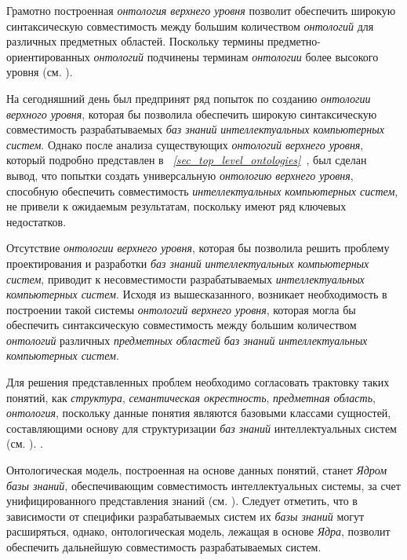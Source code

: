 Грамотно построенная \textit{онтология верхнего уровня} позволит обеспечить широкую синтаксическую совместимость между большим количеством \textit{онтологий} для различных предметных областей. Поскольку термины предметно-ориентированных \textit{онтологий} подчинены терминам \textit{онтологии} более высокого уровня (см. ). 

На сегодняшний день был предпринят ряд попыток по созданию \textit{онтологии верхного уровня}, которая бы позволила обеспечить широкую синтаксическую совместимость разрабатываемых \textit{баз знаний} \textit{интеллектуальных компьютерных систем}. Однако после анализа существующих \textit{онтологий верхнего уровня}, который подробно представлен в \textit{~\ref{sec_top_level_ontologies}~}, был сделан вывод, что попытки создать универсальную \textit{онтологию верхнего уровня}, способную обеспечить совместимость \textit{интеллектуальных компьютерных систем}, не привели к ожидаемым результатам, поскольку имеют ряд ключевых недостатков.

Отсутствие \textit{онтологии верхнего уровня}, которая бы позволила решить проблему проектирования и разработки \textit{баз знаний} \textit{интеллектуальных компьютерных систем}, приводит к несовместимости разрабатываемых \textit{интеллектуальных компьютерных систем}. Исходя из вышесказанного, возникает необходимость в построении такой системы \textit{онтологий верхнего уровня}, которая могла бы обеспечить синтаксическую совместимость между большим количеством \textit{онтологий} различных \textit{предметных областей} \textit{баз знаний} \textit{интеллектуальных компьютерных систем}. 

Для решения представленных проблем необходимо согласовать трактовку таких понятий, как \textit{структура}, \textit{семантическая окрестность}, \textit{предметная область}, \textit{онтология}, поскольку данные понятия являются базовыми классами сущностей, составляющими основу для структуризации \textit{баз знаний} интеллектуальных систем (см. ). .

Онтологическая модель, построенная на основе данных понятий, станет \textit{Ядром базы знаний}, обеспечивающим совместимость интеллектуальных системы, за счет унифицированного представления знаний (см. ). Следует отметить, что в зависимости от специфики разрабатываемых систем их \textit{базы знаний} могут расширяться, однако, онтологическая модель, лежащая в основе \textit{Ядра}, позволит обеспечить дальнейшую совместимость разрабатываемых систем.


